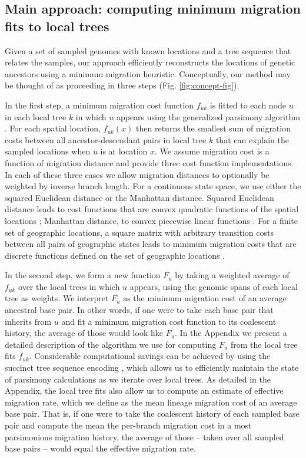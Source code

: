 \subsection{Main approach: computing minimum migration fits to local trees}

Given a set of sampled genomes with known locations and a tree sequence that
relates the samples, our approach efficiently reconstructs the locations of 
genetic ancestors using a minimum migration heuristic. Conceptually, our
method may be thought of as proceeding in three steps
(Fig. \ref{fig:concept-fig}).

In the first step, a minimum migration cost function $f_{uk}$ is fitted to each
node $u$ in each local tree $k$ in which $u$ appears using the generalized
parsimony algorithm \citep{Sankoff_1975, Sankoff_Rousseau_1975}. For each 
spatial location, $f_{uk}(x)$ then returns the smallest sum of migration costs
between all ancestor-descendant pairs in local tree $k$ that can explain the
sampled locations when $u$ is at location $x$. We assume migration cost is a function
of migration distance and provide three cost function implementations. In each 
of these three cases we allow migration distances to optionally be weighted by 
inverse branch length. For a continuous state space, we use either the squared
Euclidean distance or the Manhattan distance. Squared Euclidean distance leads
to cost functions that are convex quadratic functions of the spatial locations
\citep{Maddison_1991}; Manhattan distance, to convex piecewise linear functions
\citep{Csuros_2008}. For a finite set of geographic locations, a square matrix 
with arbitrary transition costs between all pairs of geographic states leads to
minimum migration costs that are discrete functions defined on the set of
geographic locations \citep{Clemente_etal_2009}.

In the second step, we form a new function $F_u$ by taking a weighted average 
of $f_{uk}$ over the local trees in which $u$ appears, using the genomic spans
of each local tree as weights. We interpret $F_u$ as the minimum migration cost
of an average ancestral base pair. In other words, if one were to take each
base pair that inherits from $u$ and fit a minimum migration cost function to its
coalescent history, the average of those would look like $F_u$. In the Appendix
we present a detailed description of the algorithm we use for computing
$F_u$ from the local tree fits $f_{uk}$. Considerable computational savings
can be achieved by using the succinct tree sequence encoding
\citep{Kelleher_etal_2016}, which allows us to efficiently maintain
the state of parsimony calculations as we iterate over local trees. As detailed
in the Appendix, the local tree fits also allow us to compute an estimate of
effective migration rate, which we define as the mean lineage migration cost 
of an average base pair. That is, if one were to take the coalescent history of
each sampled base pair and compute the mean the per-branch migration cost in a
most parsimonious migration history, the average of those -- taken over all
sampled base pairs -- would equal the effective migration rate.

